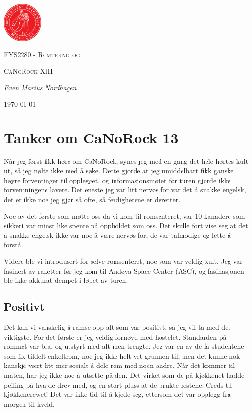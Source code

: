 \documentclass[norsk,a4paper,12pt]{article}
\begin{document}
\begin{center}
\includegraphics[width=0.15\textwidth]{uio.png}\par\vspace{1cm}
{\scshape\LARGE FYS2280 - Romteknologi \par}
\vspace{0.5cm}
{\scshape\large CaNoRock XIII\par}
\vspace{1cm}
{\Large\itshape Even Marius Nordhagen\par}
\vspace{0.5cm}
{\large \today\par}
\end{center}
\section*{Tanker om CaNoRock 13}
N{\aa}r jeg f{\o}rst fikk h{\o}re om CaNoRock, synes jeg med en gang det hele h{\o}rtes kult ut, s{\aa} jeg n{\o}lte ikke med {\aa} s{\o}ke. Dette gjorde at jeg umiddelbart fikk ganske h{\o}yre forventinger til opplegget, og informasjonsm{\o}tet f{\o}r turen gjorde ikke forventningene lavere. Det eneste jeg var litt nerv{\o}s for var det {\aa} snakke engelsk, det er ikke noe jeg gj{\o}r s{\aa} ofte, s{\aa} ferdighetene er deretter.\par
Noe av det f{\o}rste som m{\o}tte oss da vi kom til romsenteret, var 10 kanadere som sikkert var minst like spente p{\aa} oppholdet som oss. Det skulle fort vise seg at det {\aa} snakke engelsk ikke var noe {\aa} v{\ae}re nerv{\o}s for, de var t{\aa}lmodige og lette {\aa} forst{\aa}. \par
Videre ble vi introdusert for selve romsenteret, noe som var veldig kult. Jeg var fasinert av raketter f{\o}r jeg kom til And{\o}ya Space Center (ASC), og fasinasjonen ble ikke akkurat dempet i l{\o}pet av turen. 

\subsection*{Positivt}
Det kan vi vanskelig {\aa} ramse opp alt som var positivt, s{\aa} jeg vil ta med det viktigste. For det f{\o}rste er jeg veldig forn{\o}yd med hostelet. Standarden p{\aa} rommet var bra, og utstyrt med alt men trengte. Jeg var en av de f{\aa} studentene som fik tildelt enkeltrom, noe jeg ikke helt vet grunnen til, men det kunne nok kanskje v{\ae}rt litt mer sosialt {\aa} dele rom med noen andre. N{\aa}r det kommer til maten, har jeg ikke noe {\aa} utsette p{\aa} den. Det virket som de p{\aa} kj{\o}kkenet hadde peiling p{\aa} hva de drev med, og en stort pluss at de brukte restene. Creds til kj{\o}kkencrewet! Det var ikke tid til {\aa} kjede seg, ettersom det var opplegg fra morgen til kveld.
\end{document}
